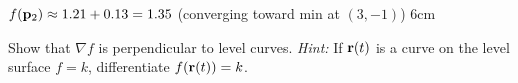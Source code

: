\documentclass[11pt]{article}
\begin{document}
\begin{practice}
{$f(\mathbf{p}_2) \approx 1.21 + 0.13 = 1.35$ (converging toward min at $(3,-1)$)
}{6cm}


\vspace{3cm}

\prob Show that $\nabla f$ is perpendicular to level curves. \textit{Hint:} If $\mathbf{r}(t)$ is a curve on the level surface $f=k$, differentiate $f(\mathbf{r}(t))=k$.


\end{practice}
\end{document}
